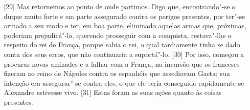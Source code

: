 {[}29{]} Mas retornemos ao ponto de onde partimos. Digo que,
encontrando"-se o duque muito forte e em parte assegurado contra os
perigos presentes, por ter"-se armado a seu modo e ter, em boa parte,
eliminado aquelas armas que, próximas, poderiam prejudicá"-lo, querendo
prosseguir com a conquista, restava"-lhe o respeito do rei de França,
porque sabia o rei, o qual tardiamente tinha se dado conta dos seus
erros, que não continuaria a suportá"-lo. {[}30{]} Por isso, começou a
procurar novas amizades e a falhar com a França, na incursão que os
franceses fizeram ao reino de Nápoles contra os espanhóis que assediavam
Gaeta; sua intenção
era assegurar"-se contra eles, o que ele teria conseguido rapidamente se
Alexandre estivesse vivo. {[}31{]} Estas foram
as suas ações quanto às coisas presentes.

